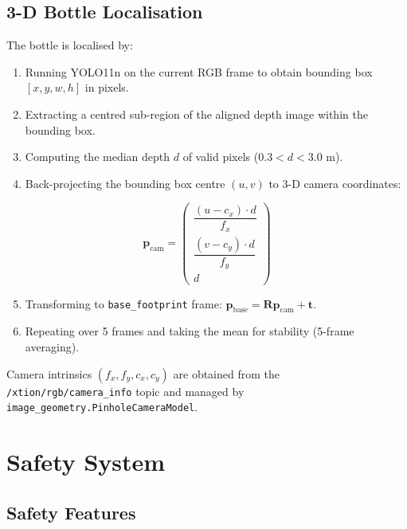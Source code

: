 \documentclass[12pt,a4paper]{report}
\begin{document}
\section{3-D Bottle Localisation}

The bottle is localised by:
\begin{enumerate}[noitemsep]
  \item Running YOLO11n on the current RGB frame to obtain bounding box
        $[x, y, w, h]$ in pixels.
  \item Extracting a centred sub-region of the aligned depth image within the bounding box.
  \item Computing the median depth $d$ of valid pixels ($0.3 < d < 3.0$ m).
  \item Back-projecting the bounding box centre $(u, v)$ to 3-D camera coordinates:
\end{enumerate}

\begin{equation}
  \mathbf{p}_{\text{cam}} =
  \begin{pmatrix}
    \dfrac{(u - c_x) \cdot d}{f_x} \\[8pt]
    \dfrac{(v - c_y) \cdot d}{f_y} \\[8pt]
    d
  \end{pmatrix}
\end{equation}

\begin{enumerate}[noitemsep]
  \setcounter{enumi}{4}
  \item Transforming to \texttt{base\_footprint} frame: $\mathbf{p}_{\text{base}} = \mathbf{R} \mathbf{p}_{\text{cam}} + \mathbf{t}$.
  \item Repeating over 5 frames and taking the mean for stability (5-frame averaging).
\end{enumerate}

Camera intrinsics $(f_x, f_y, c_x, c_y)$ are obtained from the
\texttt{/xtion/rgb/camera\_info} topic and managed by \texttt{image\_geometry.PinholeCameraModel}.

\chapter{Safety System}

\section{Safety Features}
\end{document}
